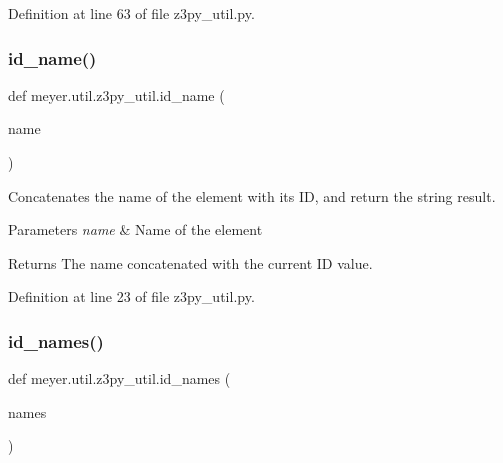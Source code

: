 Definition at line 63 of file z3py\+\_\+util.\+py.

\mbox{\label{namespacemeyer_1_1util_1_1z3py__util_ab669d0e9517ca9e314995cacdb9d451c}} 
\subsubsection{\texorpdfstring{id\+\_\+name()}{id\_name()}}
{\footnotesize\ttfamily def meyer.\+util.\+z3py\+\_\+util.\+id\+\_\+name (\begin{DoxyParamCaption}\item[{}]{name }\end{DoxyParamCaption})}



Concatenates the name of the element with its ID, and return the string result. 


\begin{DoxyParams}{Parameters}
{\em name} & Name of the element \\
\hline
\end{DoxyParams}
\begin{DoxyReturn}{Returns}
The name concatenated with the current ID value. 
\end{DoxyReturn}


Definition at line 23 of file z3py\+\_\+util.\+py.

\mbox{\label{namespacemeyer_1_1util_1_1z3py__util_a8747354710be05db88bc9188dfa16b30}} 
\subsubsection{\texorpdfstring{id\+\_\+names()}{id\_names()}}
{\footnotesize\ttfamily def meyer.\+util.\+z3py\+\_\+util.\+id\+\_\+names (\begin{DoxyParamCaption}\item[{}]{names }\end{DoxyParamCaption})}



